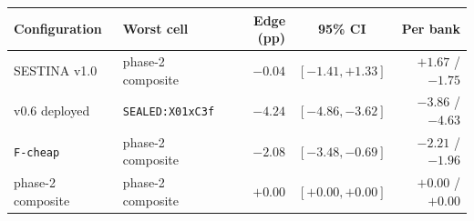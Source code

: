 \begin{tabular}{llrcr}
\toprule
Configuration & Worst cell & Edge (pp) & 95\% CI & Per bank \\
\midrule
SESTINA v1.0 & phase-2 composite & $-0.04$ & $[-1.41, +1.33]$ & $+1.67$ / $-1.75$ \\
v0.6 deployed & \texttt{SEALED:X01xC3f} & $-4.24$ & $[-4.86, -3.62]$ & $-3.86$ / $-4.63$ \\
\texttt{F-cheap} & phase-2 composite & $-2.08$ & $[-3.48, -0.69]$ & $-2.21$ / $-1.96$ \\
phase-2 composite & phase-2 composite & $+0.00$ & $[+0.00, +0.00]$ & $+0.00$ / $+0.00$ \\
\bottomrule
\end{tabular}
